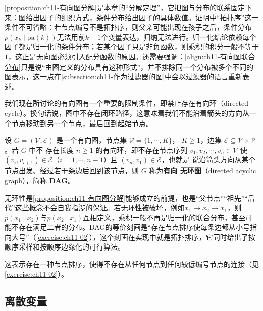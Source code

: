 \documentclass[../../main.tex]{subfiles}
\begin{document}
\begin{remark}
\cref{proposition:ch11-有向图分解}是本章的“分解定理”，它把图与分布的联系固定下来：图给出因子的组织方式，条件分布给出因子的具体数值。证明中“拓扑序”这一条件不可省略：若节点编号不是拓扑序，则父亲可能出现在孩子之后，条件分布$p(x_k\mid\mathrm{pa}(k))$无法用前$k-1$个变量表达，归纳无法进行。归一化结论依赖每个因子都是归一化的条件分布；若某个因子只是非负函数，则乘积的积分一般不等于$1$，这正是无向图必须引入配分函数的原因。还需要强调：\eqref{align:ch11-有向图联合分布}只是说“由图定义的分布具有这种形式”，并不排除同一个分布被多个不同的图表示，这一点在\cref{subsection:ch11-作为过滤器的图}中会以过滤器的语言重新表述。
\end{remark}

我们现在所讨论的有向图有一个重要的限制条件，即禁止存在有向环（directed cycle）。换句话说，图中不存在闭环路径，这意味着我们不能沿着箭头的方向从一个节点移动到另一个节点，最后回到起始节点。

\begin{definition}[有向无环图]\label{definition:ch11-有向无环图}
设 $G=(\mathcal{V},\mathcal{E})$ 是一个有向图，节点集 $\mathcal{V}=\{1,\cdots,K\}$，
$K\geqslant1$，边集 $\mathcal{E}\subseteq\mathcal{V}\times\mathcal{V}$。若 $G$ 中不
存在长度 $n\geqslant1$ 的有向环，即不存在节点序列 $v_1,v_2,\cdots,v_n\in\mathcal{V}$
使 $(v_i,v_{i+1})\in\mathcal{E}$（$i=1,\cdots,n-1$）且 $(v_n,v_1)\in\mathcal{E}$，也就是
说沿箭头方向从某个节点出发、经过若干条边后回到该节点，则 $G$ 称为\textbf{有向
无环图}（directed acyclic graph），简称 \textbf{DAG}。
\end{definition}

\begin{remark}
无环性是\cref{proposition:ch11-有向图分解}能够成立的前提，也是“父节点”“祖先”“后代”这些概念不会自我指涉的保证。若无环性被破坏，例如$x_1\to x_2\to x_1$，则$p(x_1\mid x_2)$与$p(x_2\mid x_1)$互相定义，乘积一般不再是归一化的联合分布，甚至可能不存在满足二者的分布。DAG的等价刻画是“存在节点排序使每条边都从小号指向大号”（\cref{exercise:ch11-02}），这个刻画在实现中就是拓扑排序，它同时给出了按顺序采样和按顺序边缘化的可行算法。
\end{remark}

这表示存在一种节点排序，使得不存在从任何节点到任何较低编号节点的连接（见\cref{exercise:ch11-02}）。

\subsection{离散变量}\label{subsection:ch11-离散变量}
\end{document}
